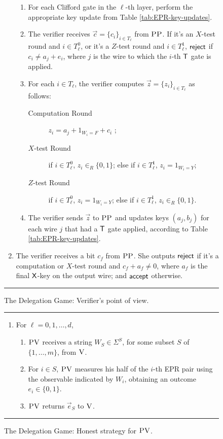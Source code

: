 \documentclass[11pt]{article}
\theoremstyle{remark}
\theoremstyle{definition}
\newcommand{\ver}{\textsc{V}}
\newcommand{\pv}{\textsc{PV}}
\newcommand{\pp}{\textsc{PP}}
\begin{document}
\begin{figure}[H]
\begin{enumerate}
\begin{enumerate}
  \item For each Clifford gate in the $\ell$-th layer, perform the appropriate key update from Table \ref{tab:EPR-key-updates}.
 \item The verifier receives $\vec{c} = \{c_i\}_{i\in T_{\ell}}$ from $\pp$. If it's an $X$-test round and $i\in T_\ell^0$, or it's a $Z$-test round and $i\in T_\ell^1$, $\sf reject$ if $c_i\neq a_{j}+ e_i$, where $j$ is the wire to which the $i$-th $\sf T$ gate is applied.
\item For each $i\in T_\ell$, the verifier computes $\vec{z}=\{z_i\}_{i\in T_\ell}$ as follows: 
\begin{description}
\item[Computation Round] $z_i=a_{j}+ 1_{W_i=F} + c_i$ ;
\item[$X$-test Round] if $i\in T_\ell^0$, $z_i\in_R\{0,1\}$; else if $i\in T_\ell^1$, $z_i=1_{W_i=Y}$;
\item[$Z$-test Round] if $i\in T_\ell^0$, $z_i=1_{W_i=Y}$; else if $i\in T_\ell^1$, $z_i\in_R\{0,1\}$.
\end{description}
\item The verifier sends $\vec{z}$ to $\pp$ and updates keys $(a_j,b_j)$ for each wire $j$ that had a $\sf T$ gate applied, according to Table \ref{tab:EPR-key-updates}.
\end{enumerate} 
\item The verifier receives a bit $c_f$ from $\pp$. She outputs $\sf reject$ if it's a computation or $X$-test round and $c_f+ a_f\neq 0$, where $a_f$ is the final $\sf X$-key on the output wire; and $\sf accept$ otherwise.
\end{enumerate}
\rule[2ex]{16.5cm}{0.5pt}\vspace{-.5cm}
\caption{The Delegation Game: Verifier's point of view.}\label{fig:leash-protocol-V}
\end{figure}

\begin{figure}[H]
\rule[1ex]{16.5cm}{0.5pt}
\begin{enumerate}
\item For $\ell=0,1,\ldots,d$,
\begin{enumerate}
\item $\pv$ receives a string $W_{S} \in\Sigma^{S}$, for some subset $S$ of $\{1,\ldots,m\}$, from $\ver$. 
\item For $i\in S$, $\pv$ measures his half of the $i$-th EPR pair using the observable indicated by $W_i$, obtaining an outcome $e_i\in\{0,1\}$. 
\item $\pv$ returns $\vec{e}_S$ to $\ver$. 
\end{enumerate}
\end{enumerate}
\rule[2ex]{16.5cm}{0.5pt}\vspace{-.5cm}
\caption{The Delegation Game: Honest strategy for $\pv$.}\label{fig:leash-protocol-PV}
\end{figure}
\end{document}
